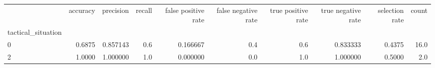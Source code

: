 \begin{tabular}{lrrrrrrrrr}
\toprule
{} &  accuracy &  precision &  recall &  false positive rate &  false negative rate &  true positive rate &  true negative rate &  selection rate &  count \\
tactical\_situation &           &            &         &                      &                      &                     &                     &                 &        \\
\midrule
0                  &    0.6875 &   0.857143 &     0.6 &             0.166667 &                  0.4 &                 0.6 &            0.833333 &          0.4375 &   16.0 \\
2                  &    1.0000 &   1.000000 &     1.0 &             0.000000 &                  0.0 &                 1.0 &            1.000000 &          0.5000 &    2.0 \\
\bottomrule
\end{tabular}
